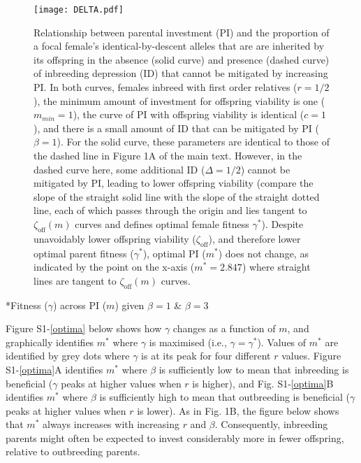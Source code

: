 \documentclass[12pt]{article}
\makeatletter
\renewcommand\section{\@startsection{section}{1}{0in}{-0.5\baselineskip}{0.1\baselineskip}{\normalfont\large\bfseries}}
\makeatother
\begin{document}
\begin{figure}
\begin{center}				
\texttt{[image: DELTA.pdf]}
\end{center}
\caption{Relationship between parental investment (PI) and the proportion of a focal female's identical-by-descent alleles that are are inherited by its offspring in the absence (solid curve) and presence (dashed curve) of inbreeding depression (ID) that cannot be mitigated by increasing PI. In both curves, females inbreed with first order relatives ($r=1/2$), the minimum amount of investment for offspring viability is one ($m_{min}=1$), the curve of PI with offspring viability is identical ($c=1$), and there is a small amount of ID that can be mitigated by PI ($\beta=1$). For the solid curve, these parameters are identical to those of the dashed line in Figure 1A of the main text. However, in the dashed curve here, some additional ID ($\Delta=1/2$) cannot be mitigated by PI, leading to lower offspring viability (compare the slope of the straight solid line with the slope of the straight dotted line, each of which passes through the origin and lies tangent to $\zeta_{\textrm{off}}(m)$ curves and defines optimal female fitness $\gamma^{*}$). Despite unavoidably lower offspring viability ($\zeta_{\textrm{off}}$), and therefore lower optimal parent fitness ($\gamma^{*}$), optimal PI ($m^{*}$) does not change, as indicated by the point on the x-axis ($m^{*}=2.847$) where straight lines are tangent to $\zeta_{\textrm{off}}(m)$ curves.}
\label{DELTA}
\end{figure}

\clearpage

\section*{Fitness ($\gamma$) across PI ($m$) given $\beta=1$ \& $\beta=3$}

\noindent Figure S1-\ref{optima} below shows how $\gamma$ changes as a function of $m$, and graphically identifies $m^{*}$ where $\gamma$ is maximised (i.e., $\gamma = \gamma^{*}$). Values of $m^{*}$ are identified by grey dots where $\gamma$ is at its peak for four different $r$ values. Figure S1-\ref{optima}A identifies $m^{*}$ where $\beta$ is sufficiently low to mean that inbreeding is beneficial ($\gamma$ peaks at higher values when $r$ is higher), and Fig. S1-\ref{optima}B identifies $m^{*}$ where $\beta$ is sufficiently high to mean that outbreeding is beneficial ($\gamma$ peaks at higher values when $r$ is lower). As in Fig. 1B, the figure below shows that $m^{*}$ always increases with increasing $r$ and $\beta$. Consequently, inbreeding parents might often be expected to invest considerably more in fewer offspring, relative to outbreeding parents.
\end{document}
